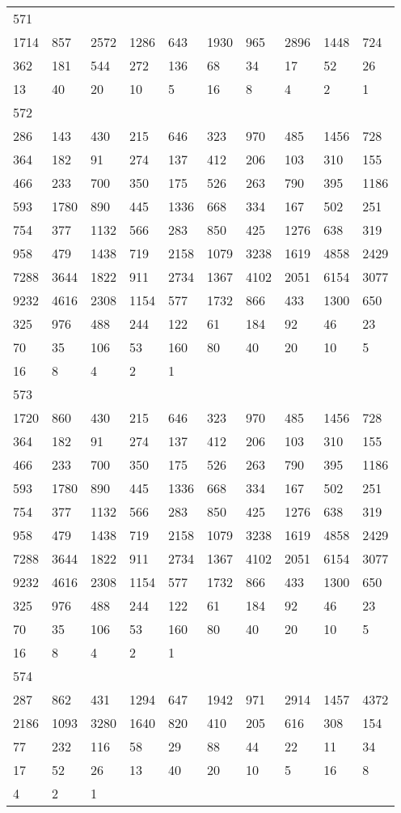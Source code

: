 \begin{longtable}{*{10}{l}}
571&&&&&&&&&\\
1714& 857& 2572& 1286& 643& 1930& 965& 2896& 1448& 724\\
362& 181& 544& 272& 136& 68& 34& 17& 52& 26\\
13& 40& 20& 10& 5& 16& 8& 4& 2& 1\\

572&&&&&&&&&\\
286& 143& 430& 215& 646& 323& 970& 485& 1456& 728\\
364& 182& 91& 274& 137& 412& 206& 103& 310& 155\\
466& 233& 700& 350& 175& 526& 263& 790& 395& 1186\\
593& 1780& 890& 445& 1336& 668& 334& 167& 502& 251\\
754& 377& 1132& 566& 283& 850& 425& 1276& 638& 319\\
958& 479& 1438& 719& 2158& 1079& 3238& 1619& 4858& 2429\\
7288& 3644& 1822& 911& 2734& 1367& 4102& 2051& 6154& 3077\\
9232& 4616& 2308& 1154& 577& 1732& 866& 433& 1300& 650\\
325& 976& 488& 244& 122& 61& 184& 92& 46& 23\\
70& 35& 106& 53& 160& 80& 40& 20& 10& 5\\
16& 8& 4& 2& 1& \\

573&&&&&&&&&\\
1720& 860& 430& 215& 646& 323& 970& 485& 1456& 728\\
364& 182& 91& 274& 137& 412& 206& 103& 310& 155\\
466& 233& 700& 350& 175& 526& 263& 790& 395& 1186\\
593& 1780& 890& 445& 1336& 668& 334& 167& 502& 251\\
754& 377& 1132& 566& 283& 850& 425& 1276& 638& 319\\
958& 479& 1438& 719& 2158& 1079& 3238& 1619& 4858& 2429\\
7288& 3644& 1822& 911& 2734& 1367& 4102& 2051& 6154& 3077\\
9232& 4616& 2308& 1154& 577& 1732& 866& 433& 1300& 650\\
325& 976& 488& 244& 122& 61& 184& 92& 46& 23\\
70& 35& 106& 53& 160& 80& 40& 20& 10& 5\\
16& 8& 4& 2& 1& \\

574&&&&&&&&&\\
287& 862& 431& 1294& 647& 1942& 971& 2914& 1457& 4372\\
2186& 1093& 3280& 1640& 820& 410& 205& 616& 308& 154\\
77& 232& 116& 58& 29& 88& 44& 22& 11& 34\\
17& 52& 26& 13& 40& 20& 10& 5& 16& 8\\
4& 2& 1& \\


\end{longtable}
